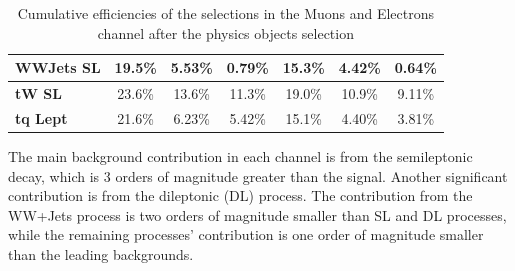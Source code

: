 \begin{table}[H]
\begin{tabular}{l|ccc||ccc}
         \midrule
         \textbf{WWJets SL}& 19.5\% & 5.53\% & 0.79\% & 15.3\% & 4.42\% & 0.64\% \\
         \midrule
         \textbf{tW SL}& 23.6\% & 13.6\%  & 11.3\% & 19.0\% &10.9\% &9.11\%  \\
         \midrule
         \textbf{tq Lept}& 21.6\%  &6.23\% & 5.42\% & 15.1\% & 4.40\% &3.81\% \\
         \bottomrule
    \end{tabular}
    \caption{Cumulative efficiencies of the selections in the Muons and Electrons channel after the physics objects selection}
    \label{tab:event_selection}
\end{table}
\vspace{-0.5cm}
The main background contribution in each channel is from the \ttbar semileptonic decay, which is 3 orders of magnitude greater than the signal.
Another significant contribution is from the \ttbar dileptonic (DL) process. The contribution from the WW+Jets process is two orders of magnitude smaller than \ttbar SL and \ttbar DL processes, while the remaining processes' contribution is one order of magnitude smaller than the leading backgrounds. 

